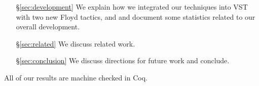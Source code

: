 \begin{itemize}
\item[\S\ref{sec:development}] We explain how we integrated our techniques into VST with two new Floyd tactics,  and  and document some statistics related to our overall development.
\item[\S\ref{sec:related}] We discuss related work.
\item[\S\ref{sec:conclusion}] We discuss directions for future work and conclude.
\end{itemize}
All of our results are machine checked in Coq.

